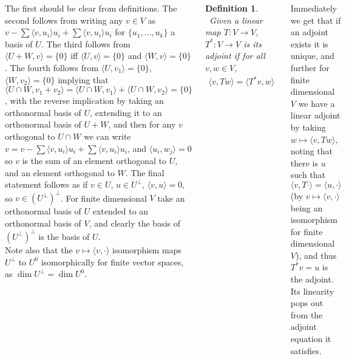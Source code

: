 \documentclass{tikzposter} %
\newtheorem{definition}{Definition}
\begin{document}
\begin{columns}
{       The first should be clear from definitions. The second follows from writing any $v \in V$ as $v - \sum \langle v, u_{i} \rangle u_{i} + \sum \langle v, u_{i} \rangle u_{i}$ for $\{u_{1}, \dots, u_{k}\}$ a basis of $U$. The third follows from $\langle U + W, v \rangle = \{0\}$ iff $\langle U, v \rangle = \{0\}$ and $\langle W, v \rangle = \{0\}$. The fourth follows from $\langle U, v_{1} \rangle = \{0\}$, $\langle W, v_{2} \rangle = \{0\}$ implying that $\langle U \cap W , v_{1} + v_{2}\rangle = \langle U \cap W, v_{1} \rangle + \langle U \cap W, v_{2}\rangle = \{0\}$, with the reverse implication by taking an orthonormal basis of $U$, extending it to an orthonormal basis of $U + W$, and then for any $v$ orthogonal to $U \cap W$ we can write $v = v - \sum \langle v, u_{i} \rangle u_{i} + \sum \langle v, u_{i} \rangle u_{i}$, and $\langle u_{i}, w_{j} \rangle = 0$ so $v$ is the sum of an element orthogonal to $U$, and an element orthogonal to $W$. The final statement follows as if $v \in U$, $u \in U^{\bot}$, $\langle v, u \rangle = 0$, so $v \in (U^{\bot})^{\bot}$. For finite dimensional $V$ take an orthonormal basis of $U$ extended to an orthonormal basis of $V$, and clearly the basis of $(U^{\bot})^{\bot}$ is the basis of $U$.\\

       Note also that the $v \mapsto \langle v, \cdot \rangle$ isomorphism maps $U^{\bot}$ to $U^{0}$ isomorphically for finite vector spaces, as $\dim U^{\bot} = \dim U^{0}$. \\

       \begin{definition}
         \ Given a linear map $T : V \to V$, $T^{*} : V \to V$ is its adjoint if for all $v, w \in V$,
         \begin{align*}
           \langle v, Tw \rangle = \langle T^{*}v, w \rangle
         \end{align*}
       \end{definition}
       \hphantom{}

       Immediately we get that if an adjoint exists it is unique, and further for finite dimensional $V$ we have a linear adjoint by taking $w \mapsto \langle v, Tw \rangle $, noting that there is $u$ such that $\langle v, T\cdot \rangle = \langle u, \cdot\rangle$ (by $v \mapsto \langle v, \cdot \rangle$ being an isomorphism for finite dimensional $V$), and thus $T^{*}v = u$ is the adjoint. Its linearity pops out from the adjoint equation it satisfies. \\

}
\end{columns}
\end{document}

